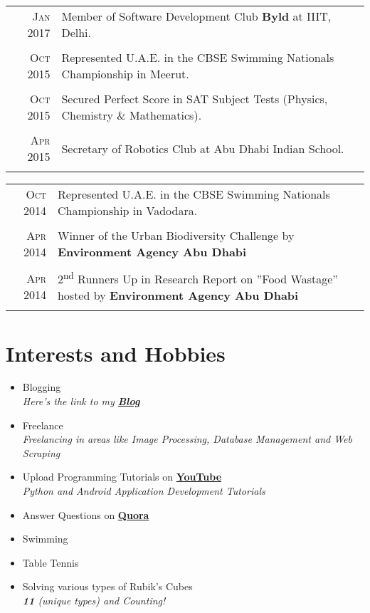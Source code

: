 \documentclass[a4paper,10pt]{article}
\begin{document}
\begin{tabular}{r|p{13.7cm}}
\textsc{Jan} 2017 & Member of Software Development Club \textbf{Byld} at IIIT, Delhi.  \\\multicolumn{2}{c}{}\\
\textsc{Oct} 2015 & Represented U.A.E. in the CBSE Swimming Nationals Championship in Meerut.\\\multicolumn{2}{c}{}\\
\textsc{Oct} 2015 & Secured Perfect Score in SAT Subject Tests (Physics, Chemistry \& Mathematics).\\\multicolumn{2}{c}{}\\
\textsc{Apr} 2015 & Secretary of Robotics Club at Abu Dhabi Indian School. \\\multicolumn{2}{c}{}\\
\end{tabular}
 
 \newpage
 
\begin{tabular}{r|p{13.7cm}}
\textsc{Oct} 2014 & Represented U.A.E. in the CBSE Swimming Nationals Championship in Vadodara.  \\\multicolumn{2}{c}{}\\
\textsc{Apr} 2014 & Winner of the Urban Biodiversity Challenge by \textbf{Environment Agency Abu Dhabi} \\\multicolumn{2}{c}{}\\
\textsc{Apr} 2014 & 2\textsuperscript{nd} Runners Up in Research Report on ''Food Wastage'' hosted by \textbf{Environment Agency Abu Dhabi} \\\multicolumn{2}{c}{}\\
\end{tabular}

\section{Interests and Hobbies}
\begin{itemize}
  \item Blogging \\
  \emph{\small{Here's the link to my \href{https://medium.com/@yashitmaheshwary}{\textbf{Blog}}}}
  \item Freelance \\
  \emph{\small{Freelancing in areas like Image Processing, Database Management and Web Scraping}}
  \item Upload Programming Tutorials on \href{https://www.youtube.com/channel/UC5A8roRFNDmhw4jNKiQqWnQ}{\textbf{YouTube}} \\
  \emph{\small{Python and Android Application Development Tutorials}}
  \item Answer Questions on \href{https://www.quora.com/profile/Yashit-Maheshwary}{\textbf{Quora}}
  \item Swimming
  \item Table Tennis
  \item Solving various types of Rubik's Cubes \\
  \emph{\normalsize{\textbf{11}} \small{(unique types) and Counting!}}
\end{itemize}
\end{document}
